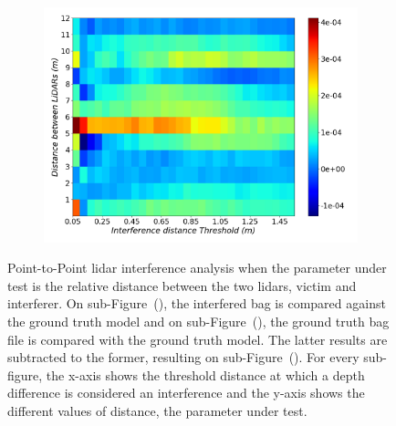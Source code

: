 \begin{figure}[!ht]
\begin{subfigure}[c]{0.45\textwidth}
	\label{fig:distance:ground-truth-color-mesh}
\end{subfigure}
\\ \vspace{4mm}
\begin{subfigure}[c]{0.6\textwidth}
	\includegraphics[width=\textwidth]{img/lidar-interference/distance/difference_ground_truth_interference_measurement.png}
\caption{}%
	\label{fig:distance:difference-color-mesh}
\end{subfigure}

\caption[Point-to-Point analysis when the distance between \acp{lidar} is variated.]{Point-to-Point \ac{lidar} interference analysis when the parameter under test is the relative distance between the two \acp{lidar}, victim and interferer. On sub-Figure~(), the interfered bag is compared against the ground truth model and on sub-Figure~(), the ground truth bag file is compared with the ground truth model. The latter results are subtracted to the former, resulting on sub-Figure~(). For every sub-figure, the x-axis shows the threshold distance at which a depth difference is considered an interference and the y-axis shows the different values of distance, the parameter under test.}
\label{fig:distance:color-mesh}
\end{figure}

